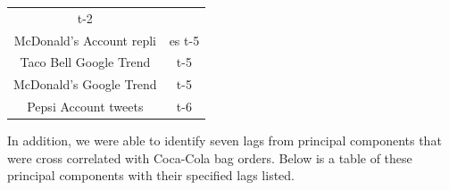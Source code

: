 \documentclass[12pt,oneside]{chicagocapstone}
\begin{document}
\begin{longtable}[]{@{}cc@{}}
\begin{minipage}[t]{0.43\columnwidth}
t-2\strut
\end{minipage}\tabularnewline
\begin{minipage}[t]{0.34\columnwidth}\centering\strut
McDonald's Account repli\strut
\end{minipage} & \begin{minipage}[t]{0.43\columnwidth}\centering\strut
es t-5\strut
\end{minipage}\tabularnewline
\begin{minipage}[t]{0.34\columnwidth}\centering\strut
Taco Bell Google Trend\strut
\end{minipage} & \begin{minipage}[t]{0.43\columnwidth}\centering\strut
t-5\strut
\end{minipage}\tabularnewline
\begin{minipage}[t]{0.34\columnwidth}\centering\strut
McDonald's Google Trend\strut
\end{minipage} & \begin{minipage}[t]{0.43\columnwidth}\centering\strut
t-5\strut
\end{minipage}\tabularnewline
\begin{minipage}[t]{0.34\columnwidth}\centering\strut
Pepsi Account tweets\strut
\end{minipage} & \begin{minipage}[t]{0.43\columnwidth}\centering\strut
t-6\strut
\end{minipage}\tabularnewline
\bottomrule
\end{longtable}
In addition, we were able to identify seven lags from principal
components that were cross correlated with Coca-Cola bag orders. Below
is a table of these principal components with their specified lags
listed.
\end{document}
